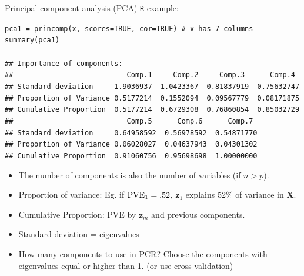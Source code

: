 \documentclass{beamer}
\begin{document}
\begin{frame}{Principal component analysis (PCA)}
\texttt{R} example:\\
\smallskip
\footnotesize{
\texttt{pca1 = princomp(x, scores=TRUE, cor=TRUE) \# x has 7 columns\\
summary(pca1)\\
~\\
\#\# Importance of components:\\
\#\# ~~~~~~~~~~~~~~~~~~~~~~~~~~Comp.1~~~~~Comp.2~~~~~Comp.3~~~~~~Comp.4\\
\#\# Standard deviation~~~~~1.9036937~ 1.0423367~ 0.81837919~ 0.75632747\\
\#\# Proportion of Variance 0.5177214~ 0.1552094~ 0.09567779~ 0.08171875\\
\#\# Cumulative Proportion~ 0.5177214~ 0.6729308~ 0.76860854~ 0.85032729\\
\#\# ~~~~~~~~~~~~~~~~~~~~~~~~~~Comp.5~~~~~~Comp.6~~~~~~Comp.7\\
\#\# Standard deviation~~~~~0.64958592~ 0.56978592~ 0.54871770\\
\#\# Proportion of Variance 0.06028027~ 0.04637943~ 0.04301302\\
\#\# Cumulative Proportion~ 0.91060756~ 0.95698698~ 1.00000000\\
}
\begin{itemize}
\item The number of components is also the number of variables (if $n>p$).
\item Proportion of variance: Eg. if $\textnormal{PVE}_1 = .52$, $\bm{z}_1$ explains 52\% of variance in $\bm{X}$.
\item Cumulative Proportion: PVE by $\bm{z}_m$ and previous components.
\item Standard deviation = eigenvalues
\item How many components to use in PCR? Choose the components with eigenvalues equal or higher than 1. (or use cross-validation)
\end{itemize}
}
\end{frame}
\end{document}
